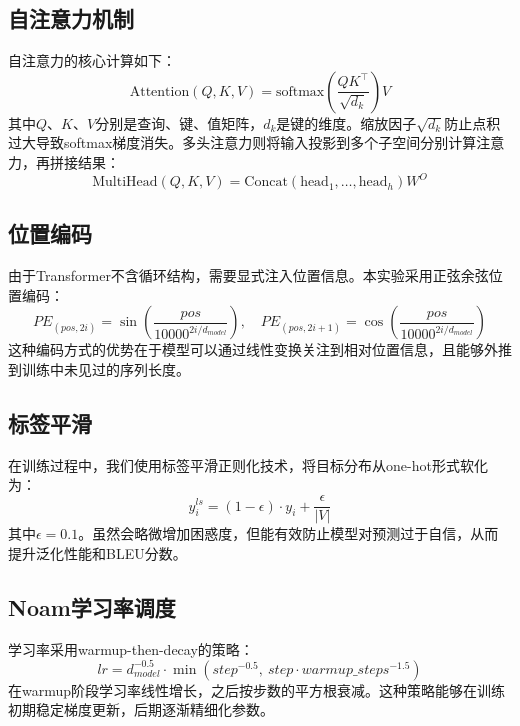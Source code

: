 \documentclass[12pt,a4paper]{article}
\begin{document}
\subsection{自注意力机制}

自注意力的核心计算如下：
\begin{equation}
    \text{Attention}(Q, K, V) = \text{softmax}\left(\frac{QK^\top}{\sqrt{d_k}}\right)V
\end{equation}
其中$Q$、$K$、$V$分别是查询、键、值矩阵，$d_k$是键的维度。缩放因子$\sqrt{d_k}$防止点积过大导致softmax梯度消失。多头注意力则将输入投影到多个子空间分别计算注意力，再拼接结果：
\begin{equation}
    \text{MultiHead}(Q, K, V) = \text{Concat}(\text{head}_1, \ldots, \text{head}_h)W^O
\end{equation}

\subsection{位置编码}

由于Transformer不含循环结构，需要显式注入位置信息。本实验采用正弦余弦位置编码：
\begin{equation}
    PE_{(pos, 2i)} = \sin\left(\frac{pos}{10000^{2i/d_{model}}}\right), \quad
    PE_{(pos, 2i+1)} = \cos\left(\frac{pos}{10000^{2i/d_{model}}}\right)
\end{equation}
这种编码方式的优势在于模型可以通过线性变换关注到相对位置信息，且能够外推到训练中未见过的序列长度。

\subsection{标签平滑}

在训练过程中，我们使用标签平滑正则化技术，将目标分布从one-hot形式软化为：
\begin{equation}
    y_i^{ls} = (1 - \epsilon) \cdot y_i + \frac{\epsilon}{|V|}
\end{equation}
其中$\epsilon=0.1$。虽然会略微增加困惑度，但能有效防止模型对预测过于自信，从而提升泛化性能和BLEU分数。

\subsection{Noam学习率调度}

学习率采用warmup-then-decay的策略：
\begin{equation}
    lr = d_{model}^{-0.5} \cdot \min(step^{-0.5},\ step \cdot warmup\_steps^{-1.5})
\end{equation}
在warmup阶段学习率线性增长，之后按步数的平方根衰减。这种策略能够在训练初期稳定梯度更新，后期逐渐精细化参数。
\end{document}
